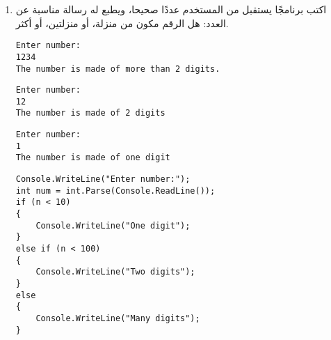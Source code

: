 ﻿\documentclass[12pt]{article}
\begin{document}
\begin{enumerate}[itemsep=3em]
\begin{enumerate}
\item اكتب برنامجًا يستقبل من المستخدم عددًا صحيحا، ويطبع له رسالة مناسبة عن العدد: هل الرقم مكون من منزلة، أو منزلتين، أو أكثر.
\ifdetailed
\begin{boxExample}[1]
\begin{english}
\begin{verbatim}
Enter number:
1234
The number is made of more than 2 digits.
\end{verbatim}
\end{english}
\end{boxExample}
\begin{boxExample}[2]
\begin{english}
\begin{verbatim}
Enter number:
12
The number is made of 2 digits
\end{verbatim}
\end{english}
\end{boxExample}
\begin{boxExample}[3]
\begin{english}
\begin{verbatim}
Enter number:
1
The number is made of one digit
\end{verbatim}
\end{english}
\end{boxExample}

\ifwithsols
\begin{boxSolution}
\begin{english}
\begin{verbatim}
Console.WriteLine("Enter number:");
int num = int.Parse(Console.ReadLine());
if (n < 10)
{
    Console.WriteLine("One digit");
}
else if (n < 100)
{
    Console.WriteLine("Two digits");
}
else
{
    Console.WriteLine("Many digits");
}
\end{verbatim}
\end{english}
\end{boxSolution}
\fi
\clearpage
\fi


\end{enumerate}
\end{enumerate}
\end{document}
